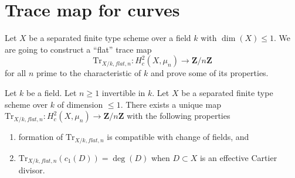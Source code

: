 \section{Trace map for curves}
\label{section-trace-curves}

\noindent
Let $X$ be a separated finite type scheme over a field $k$
with $\dim(X) \leq 1$. We are going to construct a ``flat'' trace map
$$
\text{Tr}_{X/k, \mathit{flat}, n} :
H^2_c(X, \mu_n)
\longrightarrow
\mathbf{Z}/n\mathbf{Z}
$$
for all $n$ prime to the characteristic of $k$ and prove some of its
properties.

\begin{lemma}
\label{lemma-fixed-by-c1}
Let $k$ be a field. Let $n \geq 1$ invertible in $k$. Let $X$ be a
separated finite type scheme over $k$ of dimension $\leq 1$.
There exists a unique map
$\text{Tr}_{X/k, \mathit{flat}, n} :
H^2_c(X, \mu_n)
\to
\mathbf{Z}/n\mathbf{Z}$
with the following properties
\begin{enumerate}
\item formation of $\text{Tr}_{X/k, \mathit{flat}, n}$ is compatible with
change of fields, and
\item $\text{Tr}_{X/k, \mathit{flat}, n}(c_1(D)) = \deg(D)$ when
$D \subset X$ is an effective Cartier divisor.
\end{enumerate}
\end{lemma}

